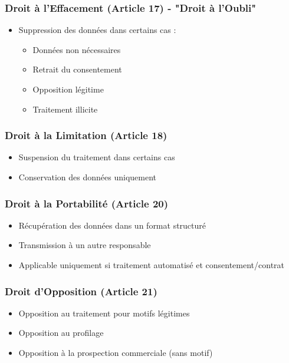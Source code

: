 \documentclass[11pt,a4paper]{article}
\begin{document}
\subsubsection{Droit à l'Effacement (Article 17) - "Droit à l'Oubli"}
\begin{itemize}
    \item Suppression des données dans certains cas :
    \begin{itemize}
        \item Données non nécessaires
        \item Retrait du consentement
        \item Opposition légitime
        \item Traitement illicite
    \end{itemize}
\end{itemize}

\subsubsection{Droit à la Limitation (Article 18)}
\begin{itemize}
    \item Suspension du traitement dans certains cas
    \item Conservation des données uniquement
\end{itemize}

\subsubsection{Droit à la Portabilité (Article 20)}
\begin{itemize}
    \item Récupération des données dans un format structuré
    \item Transmission à un autre responsable
    \item Applicable uniquement si traitement automatisé et consentement/contrat
\end{itemize}

\subsubsection{Droit d'Opposition (Article 21)}
\begin{itemize}
    \item Opposition au traitement pour motifs légitimes
    \item Opposition au profilage
    \item Opposition à la prospection commerciale (sans motif)
\end{itemize}
\end{document}
